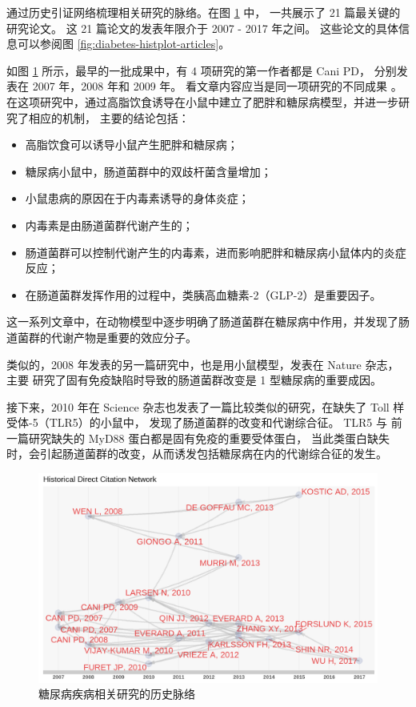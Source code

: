 \documentclass[]{ctexbook}
\providecommand{\tightlist}{%
  \setlength{\itemsep}{0pt}\setlength{\parskip}{0pt}}
\begin{document}
通过历史引证网络梳理相关研究的脉络。在图 \ref{fig:diabetes-histplot} 中，
一共展示了 21 篇最关键的研究论文。
这 21 篇论文的发表年限介于 2007 - 2017 年之间。
这些论文的具体信息可以参阅图 \ref{fig:diabetes-histplot-articles}。

如图 \ref{fig:diabetes-histplot} 所示，最早的一批成果中，有 4 项研究的第一作者都是 Cani PD，
分别发表在 2007 年，2008 年和 2009 年。
看文章内容应当是同一项研究的不同成果
\citep{caniChangesGutMicrobiota2008, caniChangesGutMicrobiota2009, caniMetabolicEndotoxemiaInitiates2007, caniSelectiveIncreasesBifidobacteria2007}。
在这项研究中，通过高脂饮食诱导在小鼠中建立了肥胖和糖尿病模型，并进一步研究了相应的机制，
主要的结论包括：

\begin{itemize}
\tightlist
\item
  高脂饮食可以诱导小鼠产生肥胖和糖尿病；
\item
  糖尿病小鼠中，肠道菌群中的双歧杆菌含量增加；
\item
  小鼠患病的原因在于内毒素诱导的身体炎症；
\item
  内毒素是由肠道菌群代谢产生的；
\item
  肠道菌群可以控制代谢产生的内毒素，进而影响肥胖和糖尿病小鼠体内的炎症反应；
\item
  在肠道菌群发挥作用的过程中，类胰高血糖素-2（GLP-2）是重要因子。
\end{itemize}

这一系列文章中，在动物模型中逐步明确了肠道菌群在糖尿病中作用，并发现了肠道菌群的代谢产物是重要的效应分子。

类似的，2008 年发表的另一篇研究中，也是用小鼠模型，发表在 Nature 杂志，主要
研究了固有免疫缺陷时导致的肠道菌群改变是 1 型糖尿病的重要成因\citep{wenInnateImmunityIntestinal2008}。

接下来，2010 年在 Science 杂志也发表了一篇比较类似的研究，在缺失了 Toll 样受体-5（TLR5）的小鼠中，
发现了肠道菌群的改变和代谢综合征\citep{vijay-kumarMetabolicSyndromeAltered2010}。
TLR5 与 前一篇研究缺失的 MyD88 蛋白都是固有免疫的重要受体蛋白，
当此类蛋白缺失时，会引起肠道菌群的改变，从而诱发包括糖尿病在内的代谢综合征的发生。

\begin{figure}
\includegraphics[width=1\linewidth]{plots/diabetes-histplot-1} \caption{糖尿病疾病相关研究的历史脉络}\label{fig:diabetes-histplot}
\end{figure}
\end{document}
